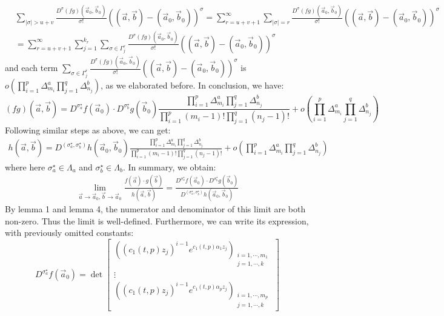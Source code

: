 \documentclass[12pt]{article}
\begin{document}
\begin{align*}
	&\sum_{|\sigma|> u+v}\frac{D^{\sigma}(fg)(\vec{a}_{0},\vec{b}_{0})}{\sigma!}((\vec{a},\vec{b})-(\vec{a}_{0},\vec{b}_{0}))^{\sigma}=\sum_{r=u+v+1}^{\infty}\sum_{|\sigma|=r}\frac{D^{\sigma}(fg)(\vec{a}_{0},\vec{b}_{0})}{\sigma!}((\vec{a},\vec{b})-(\vec{a}_{0},\vec{b}_{0}))^{\sigma}\\
	&=\sum_{r=u+v+1}^{\infty}\sum_{j=1}^{k_{r}}\sum_{\sigma\in \Gamma_{j}^{r}}\frac{D^{\sigma}(fg)(\vec{a}_{0},\vec{b}_{0})}{\sigma!}((\vec{a},\vec{b})-(\vec{a}_{0},\vec{b}_{0}))^{\sigma}
\end{align*}
and each term $\sum_{\sigma\in \Gamma_{j}^{r}}\frac{D^{\sigma}(fg)(\vec{a}_{0},\vec{b}_{0})}{\sigma!}((\vec{a},\vec{b})-(\vec{a}_{0},\vec{b}_{0}))^{\sigma}$ is $o(\prod_{i=1}^{p}\Delta_{m_{i}}^{a}\prod_{j=1}^{q}\Delta_{n_{j}}^{b})$, as we elaborated before. In conclusion, we have:
$$(fg)(\vec{a},\vec{b})=D^{\sigma_{a}^{\star}}f(\vec{a}_{0})\cdot D^{\sigma_{b}^{\star}}g(\vec{b}_{0})\frac{\prod_{i=1}^{p}\Delta_{m_{i}}^{a}\prod_{j=1}^{q}\Delta_{n_{j}}^{b}}{\prod_{i=1}^{p}(m_{i}-1)!\prod_{j=1}^{q}(n_{j}-1)!}+o(\prod_{i=1}^{p}\Delta_{m_{i}}^{a}\prod_{j=1}^{q}\Delta_{n_{j}}^{b})$$
Following similar steps as above, we can get:
\begin{align*}
	h(\vec{a},\vec{b})=D^{(\sigma_{a}^{\star},\sigma_{b}^{\star})}h(\vec{a}_{0},\vec{b}_{0})\frac{\prod_{i=1}^{p}\Delta_{m_{i}}^{a}\prod_{j=1}^{q}\Delta_{n_{j}}^{b}}{\prod_{i=1}^{p}(m_{i}-1)!\prod_{j=1}^{q}(n_{j}-1)!}+o(\prod_{i=1}^{p}\Delta_{m_{i}}^{a}\prod_{j=1}^{q}\Delta_{n_{j}}^{b})
\end{align*}
where here $\sigma_{a}^{\star}\in\Lambda_{a}$ and $\sigma_{b}^{\star}\in\Lambda_{b}$. In summary, we obtain:
\begin{align*}
	\lim_{\vec{a}\rightarrow \vec{a}_{0},\vec{b}\rightarrow \vec{a}_{0}} \frac{f(\vec{a})\cdot g(\vec{b})}{h(\vec{a},\vec{b})}=\frac{D^{\sigma_{a}^{\star}}f(\vec{a}_{0})\cdot D^{\sigma_{b}^{\star}}g(\vec{b}_{0})}{D^{(\sigma_{a}^{\star},\sigma_{b}^{\star})}h(\vec{a}_{0},\vec{b}_{0})}
\end{align*}
By lemma 1 and lemma 4, the numerator and denominator of this limit are both non-zero. Thus the limit is well-defined. Furthermore, we can write its expression, with previously omitted constants:\\
\[ D^{\sigma_{a}^{\star}}f(\vec{a}_{0})= \det
	\left[ \begin{array}{ccc}
		((c_{1}(t,p)z_{j})^{i-1}e^{c_{1}(t,p)\alpha_{1}z_{j}})_{\substack{i=1,\cdots,m_{1}\\j=1,\cdots,k}}\\
	\vdots\\
	((c_{1}(t,p)z_{j})^{i-1}e^{c_{1}(t,p)\alpha_{p}z_{j}})_{\substack{i=1,\cdots, m_{p} \\j=1,\cdots,k}}
	\end{array}
	\right]
\]
\end{document}
